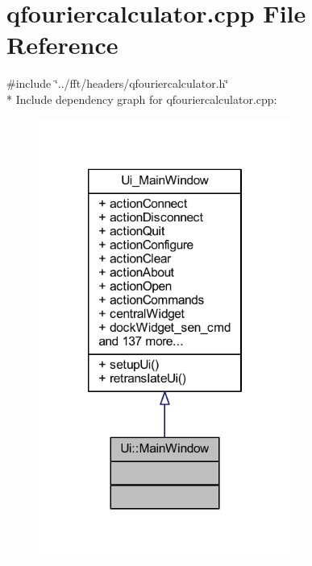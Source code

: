 \hypertarget{a00117}{\section{qfouriercalculator.\+cpp File Reference}
\label{a00117}
}
{\ttfamily \#include \char`\"{}../fft/headers/qfouriercalculator.\+h\char`\"{}}\\*
Include dependency graph for qfouriercalculator.\+cpp\+:
\nopagebreak
\begin{figure}[H]
\begin{center}
\leavevmode
\includegraphics[width=235pt]{d8/d23/a00326}
\end{center}
\end{figure}
